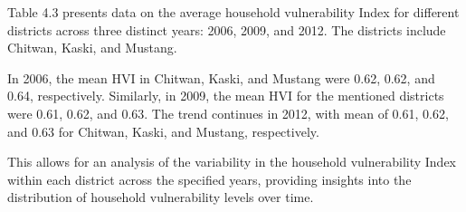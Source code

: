 Table 4.3 presents data on the average household vulnerability Index for different districts across three distinct years: 2006, 2009, and 2012. The districts include Chitwan, Kaski, and Mustang.

In 2006, the mean HVI in Chitwan, Kaski, and Mustang were 0.62, 0.62, and 0.64, respectively. Similarly, in 2009, the mean HVI for the mentioned districts were 0.61, 0.62, and 0.63. The trend continues in 2012, with mean of 0.61, 0.62, and 0.63 for Chitwan, Kaski, and Mustang, respectively.

This allows for an analysis of the variability in the household vulnerability Index within each district across the specified years, providing insights into the distribution of household vulnerability levels over time.
\begin{table}[H]
	\captionsetup{labelformat=empty}
	\caption{Table 4.3: District level mean and SD HVI for all waves}
	\label{tab:districtlevelhvi}
\end{table}
